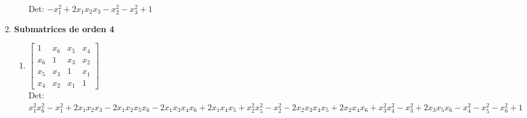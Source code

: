 \documentclass[12pt]{article}
\begin{document}
\begin{enumerate}
\begin{enumerate}
\begin{enumerate}
Det: $- x_{1}^{2} + 2 x_{1} x_{2} x_{3} - x_{2}^{2} - x_{3}^{2} + 1$\\

\end{enumerate}

\item {\bf Submatrices de orden 4}\\

\begin{enumerate}


\item $\displaystyle \left[\begin{matrix}1 & x_{6} & x_{5} & x_{4}\\x_{6} & 1 & x_{3} & x_{2}\\x_{5} & x_{3} & 1 & x_{1}\\x_{4} & x_{2} & x_{1} & 1\end{matrix}\right]$\\

Det: $x_{1}^{2} x_{6}^{2} - x_{1}^{2} + 2 x_{1} x_{2} x_{3} - 2 x_{1} x_{2} x_{5} x_{6} - 2 x_{1} x_{3} x_{4} x_{6} + 2 x_{1} x_{4} x_{5} + x_{2}^{2} x_{5}^{2} - x_{2}^{2} - 2 x_{2} x_{3} x_{4} x_{5} + 2 x_{2} x_{4} x_{6} + x_{3}^{2} x_{4}^{2} - x_{3}^{2} + 2 x_{3} x_{5} x_{6} - x_{4}^{2} - x_{5}^{2} - x_{6}^{2} + 1$\\

\end{enumerate}

\end{enumerate}


\end{enumerate}
\end{document}
